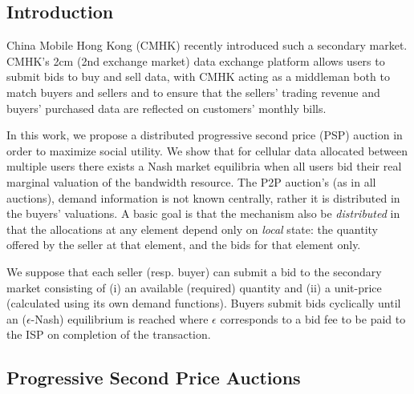 \documentclass[12pt]{article}
\theoremstyle{definition}
\begin{document}
\begin{multicols}{2}

\section{Introduction}
China Mobile Hong Kong (CMHK) recently introduced such a secondary market.
CMHK’s 2cm (2nd exchange market) data exchange platform allows users to submit
bids to buy and sell data, with CMHK acting as a middleman both to match buyers
and sellers and to ensure that the sellers’ trading revenue and buyers’
purchased data are reflected on customers’ monthly bills. \cite{zheng}

In this work, we propose a distributed progressive second price (PSP) auction in
order to maximize social utility. We show that for cellular data allocated between multiple users there
exists a Nash market equilibria when all users bid their real marginal
valuation of the bandwidth resource. The P2P auction's (as in all auctions),
demand information is not known centrally, rather it is distributed in the
buyers' valuations. A basic goal is that the mechanism also be
\emph{distributed} in that the allocations at any element depend only on
\emph{local} state: the quantity offered by the seller at that element, and the bids for that element only.

We suppose that each seller (resp. buyer) can submit a bid to the secondary
market consisting of (i) an available (required) quantity and (ii) a unit-price (calculated
using its own demand functions). Buyers submit bids cyclically until an
($\epsilon$-Nash) equilibrium is reached where $\epsilon$ corresponds to a bid
fee to be paid to the ISP on completion of the transaction.

\subsection{Progressive Second Price Auctions}


\end{multicols}
\end{document}
